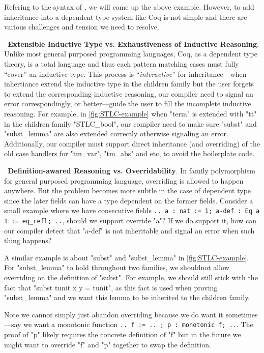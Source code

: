 Refering to the syntax of \citet{zm2017}, we will come up the above
example. However, to add inheritance into a dependent type system like
Coq is not simple and there are various challenges and tension we need
to resolve. 


~\textbf{Extensible Inductive Type vs. Exhaustiveness of Inductive Reasoning}.
Unlike most general purposed programming languages, Coq, as a dependent
type theory, is a total language and thus each pattern matching cases
must fully ``cover'' an inductive type. This process is
``\textit{interactive}'' for inheritance---when inhertiance extend the
inductive type in the children family but the user forgets to extend the
corresponding inductive reasoning, our compiler need to signal an error
correspondingly, or better---guide the user to fill the incomplete
inductive reasoning. For example, in \cref{fig:STLC-example} when "term"
is extended with "tt" in the children family "STLC_bool", our compiler
need to make sure "subst" and "subst_lemma" are also extended correctly
otherwise signaling an error.
Additionally, our compiler must support direct inheritance (and
overriding) of the old case handlers for "tm_var", "tm_abs" and etc, to avoid
the boilerplate code. 


~\textbf{Definition-awared Reasoning vs. Overridability}.
In family polymorphism for general purposed programming language,
overriding is allowed to happen anywhere. But the problem becomes more
subtle in the case of dependent type since the later fields can have a
type dependent on the former fields.  Consider a small example where we
have consecutive fields \texttt{{.. a : nat := 1; a-def : Eq a
1 := eq_refl; ..}}, should we support override "a"? If we do support it,
how can our compiler detect that "a-def" is not inheritable and signal
an error when such thing happens? 

A similar example is about "subst" and "subst_lemma" in
\cref{fig:STLC-example}. For "subst_lemma" to hold throughout two
families, we shouldnot allow overriding on the definition of "subst".
For example, we should still stick with the fact that "subst tunit x y =
tunit", as this fact is used when proving "subst_lemma" and we want this
lemma to be inherited to the children family.

Note we cannot simply just abandon overriding because we do want it sometimes---say we want a monotonic function \texttt{{.. f := .. ; p : monotonic f; ..}}. The proof of "p" likely requires the concrete definition of "f" but in the future we might want to override "f" and "p" together to swap the definition.

